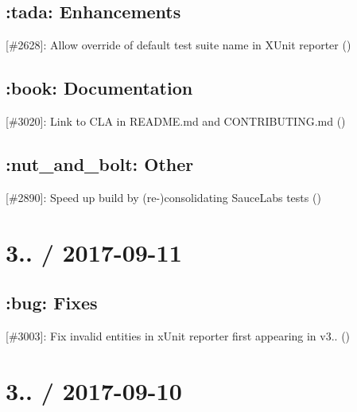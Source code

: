 \subsection*{\+:tada\+: Enhancements}


\begin{DoxyItemize}
\item \mbox{[}\#2628\mbox{]}\+: Allow override of default test suite name in X\+Unit reporter (\href{https://github.com/ngeor}{\tt })
\end{DoxyItemize}

\subsection*{\+:book\+: Documentation}


\begin{DoxyItemize}
\item \mbox{[}\#3020\mbox{]}\+: Link to C\+LA in {\ttfamily R\+E\+A\+D\+M\+E.\+md} and {\ttfamily C\+O\+N\+T\+R\+I\+B\+U\+T\+I\+N\+G.\+md} (\href{https://github.com/skeggse}{\tt })
\end{DoxyItemize}

\subsection*{\+:nut\+\_\+and\+\_\+bolt\+: Other}


\begin{DoxyItemize}
\item \mbox{[}\#2890\mbox{]}\+: Speed up build by (re-\/)consolidating Sauce\+Labs tests (\href{https://github.com/boneskull}{\tt })
\end{DoxyItemize}

\section*{3.. / 2017-\/09-\/11}

\subsection*{\+:bug\+: Fixes}


\begin{DoxyItemize}
\item \mbox{[}\#3003\mbox{]}\+: Fix invalid entities in x\+Unit reporter first appearing in v3.. (\href{https://github.com/jkrems}{\tt })
\end{DoxyItemize}

\section*{3.. / 2017-\/09-\/10}

